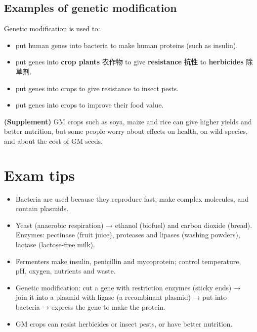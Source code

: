 \documentclass[11pt]{article}
\begin{document}
\subsection*{Examples of genetic modification}

Genetic modification is used to:

\begin{itemize}
\item put human genes into bacteria to make human proteins (such as insulin).

\item put genes into \textbf{crop plants} 农作物 to give \textbf{resistance} 抗性 to \textbf{herbicides} 除草剂.

\item put genes into crops to give resistance to insect pests.

\item put genes into crops to improve their food value.

\end{itemize}

\textbf{(Supplement)} GM crops such as soya, maize and rice can give higher yields and better nutrition, but some people worry about effects on health, on wild species, and about the cost of GM seeds.

\section*{Exam tips}

\begin{itemize}
\item Bacteria are used because they reproduce fast, make complex molecules, and contain plasmids.

\item Yeast (anaerobic respiration) → ethanol (biofuel) and carbon dioxide (bread). Enzymes: pectinase (fruit juice), proteases and lipases (washing powders), lactase (lactose-free milk).

\item Fermenters make insulin, penicillin and mycoprotein; control temperature, pH, oxygen, nutrients and waste.

\item Genetic modification: cut a gene with restriction enzymes (sticky ends) → join it into a plasmid with ligase (a recombinant plasmid) → put into bacteria → express the gene to make the protein.

\item GM crops can resist herbicides or insect pests, or have better nutrition.

\end{itemize}
\end{document}
